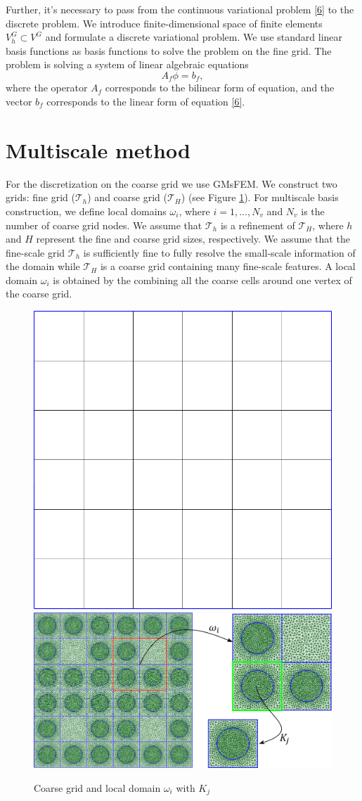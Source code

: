 \documentclass[preprint]{elsarticle}
\begin{document}
Further, it's necessary to pass from the continuous variational problem \eqref{6} to the discrete problem. 
We introduce finite-dimensional space of finite elements $V^G_h \subset V^G$ and formulate a discrete variational problem. 
We use standard linear basis functions as basis functions to solve the problem on the fine grid.
The problem is solving a system of linear algebraic equations
\begin{equation}\label{7}
	A_f \phi = b_f,
\end{equation}
where the operator $A_f$ corresponds to the bilinear form of equation, and the vector $b_f$ corresponds to the linear form of equation \eqref{6}.

\section{Multiscale method}
For the discretization on the coarse grid we use GMsFEM.
We construct two grids: fine grid ($\mathcal{T}_h$) and coarse grid ($\mathcal{T}_H$) (see Figure \ref{grid}).
For multiscale basis construction, we define local domains $\omega_i$, where $i = 1,..., N_v$ and $N_v$ is the number of coarse grid nodes.
We assume that $\mathcal{T}_h$ is a refinement of $\mathcal{T}_H$, where $h$ and $H$ represent the fine and coarse grid sizes, respectively. 
We assume that the fine-scale grid $\mathcal{T}_h$ is sufficiently fine to fully resolve the small-scale information of the domain  while $\mathcal{T}_H$ is a coarse grid containing many fine-scale features.
A local domain $\omega_i$ is obtained by the combining all the coarse cells around one vertex of the coarse grid. 

\begin{figure}[ht]
	\centering
		\includegraphics[width=0.3\linewidth]{coarse_grid.png} \hspace{2em}
		\includegraphics[width=0.57\linewidth]{omega.png} 
	\caption{Coarse grid and local domain $\omega_i$ with $K_j$}
	\label{grid}
\end{figure} 
\end{document}
